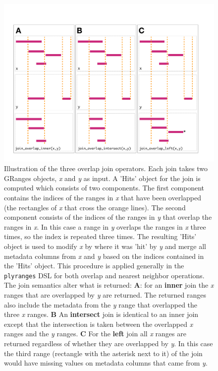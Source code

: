 \documentclass[]{article}
\begin{document}
\begin{figure}
\includegraphics[width=\textwidth]{diagrams/olap-fig}
\caption{Illustration of the three overlap join operators. Each join takes two 
GRanges objects, \textit{x} and \textit{y} as input. A 'Hits' object for the 
join is computed which consists of two components. The first component contains 
the indices of the ranges in \textit{x} that have been overlapped 
(the rectangles of \textit{x} that cross the orange lines). The second 
component consists of the indices of the ranges in \textit{y} that overlap 
the ranges in \textit{x}. In this case a range in \textit{y} overlaps the 
ranges in \textit{x} three times, so the index is repeated three times. The 
resulting 'Hits' object is used to modify \textit{x} by where it was 'hit' by
\textit{y} and merge all metadata columns from \textit{x} and \textit{y} 
based on the indices contained in the 'Hits' object. This procedure is applied 
generally in the \texttt{plyranges} DSL for both overlap and nearest neighbor
operations. The join semantics alter what is returned: \textbf{A}: for an 
\textbf{inner} join the \textit{x} ranges that are overlapped by \textit{y} 
are returned. The returned ranges also include the metadata from the \textit{y}
range that overlapped the three \textit{x} ranges. \textbf{B} An 
\textbf{intersect} join is identical to an inner join except that the 
intersection is taken between the overlapped \textit{x} ranges and the 
\textit{y} ranges. \textbf{C} For the \textbf{left} join all 
\textit{x} ranges are returned regardless of whether they are overlapped by 
\textit{y}. In this case the third range (rectangle with the asterisk next to it)
of the join would have missing values on metadata columns that came from \textit{y}.}
\label{fig:olaps-fig}
\end{figure}
\end{document}
